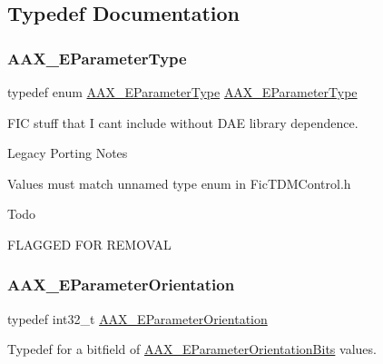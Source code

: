 \subsection{Typedef Documentation}
\mbox{\label{a00491_a193b89c4e2c5b57f2c4d7d5b5782fe87}} 
\subsubsection{\texorpdfstring{AAX\_EParameterType}{AAX\_EParameterType}}
{\footnotesize\ttfamily typedef enum \mbox{\hyperlink{a00491_a4cd0f189daa9a60cf36883c56344bb2e}{A\+A\+X\+\_\+\+E\+Parameter\+Type}}  \mbox{\hyperlink{a00491_a4cd0f189daa9a60cf36883c56344bb2e}{A\+A\+X\+\_\+\+E\+Parameter\+Type}}}



F\+IC stuff that I can\textquotesingle{}t include without D\+AE library dependence. 

\begin{DoxyRefDesc}{Legacy Porting Notes}
\item[\mbox{\hyperlink{a00787__porting_notes000010}{Legacy Porting Notes}}]Values must match unnamed type enum in Fic\+T\+D\+M\+Control.\+h\end{DoxyRefDesc}


\begin{DoxyRefDesc}{Todo}
\item[\mbox{\hyperlink{a00785__todo000028}{Todo}}]F\+L\+A\+G\+G\+ED F\+OR R\+E\+M\+O\+V\+AL\end{DoxyRefDesc}
\mbox{\label{a00491_a52f91d1c14aa5dceedabfb9d2de31bf0}} 
\subsubsection{\texorpdfstring{AAX\_EParameterOrientation}{AAX\_EParameterOrientation}}
{\footnotesize\ttfamily typedef int32\+\_\+t \mbox{\hyperlink{a00491_a52f91d1c14aa5dceedabfb9d2de31bf0}{A\+A\+X\+\_\+\+E\+Parameter\+Orientation}}}



Typedef for a bitfield of \mbox{\hyperlink{a00491_aa5ffa1ed828630b6b7a13c049d93ae87}{A\+A\+X\+\_\+\+E\+Parameter\+Orientation\+Bits}} values. 



